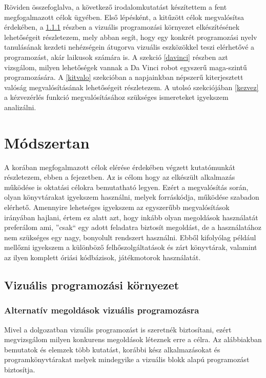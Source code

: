 \documentclass[12pt,a4paper,oneside]{report} %
\begin{document}
\par Röviden összefoglalva, a következő irodalomkutatást készítettem a fent megfogalmazott célok ügyében. Első lépésként,  a kitűzött célok  megvalósítsa érdekében, a \ref{vizuprogkor} részben a vizuális programozási környezet elkészítésének lehetőségeit részletezem, mely abban segít, hogy egy konkrét programozási nyelv tanulásának kezdeti nehézségein átugorva vizuális eszközökkel teszi elérhetővé a programozást, akár laikusok számára is. A  szekció \ref{davinci} részben azt vizsgálom, milyen lehetőségek vannak a Da Vinci robot egyszerű maga-szintű programozására. A \ref{kitvalo} szekcióban a napjainkban népszerű kiterjesztett valóság megvalósításának lehetőségeit részletezem. A  utolsó szekciójában \ref{kezvez} a kézvezérlés funkció megvalósításához szükséges ismereteket igyekszem analizálni.


\chapter{Módszertan}
\label{modtan}
A korában megfogalmazott célok elérése érdekében végzett kutatómunkát részletezem, ebben a fejezetben.
Az is célom hogy az elkészült alkalmazás működése is oktatási célokra bemutatható legyen. Ezért a megvalósítás során, olyan könyvtárakat igyekszem használni,  melyek forráskódja, működése szabadon elérhető. Amennyire lehetséges igyekszem az egyszerűbb megvalósítások irányában hajlani, értem ez alatt azt, hogy inkább olyan megoldások használatát preferálom ami, ''csak`` egy adott feladatra biztosít megoldást, de a használatához nem szükséges egy nagy, bonyolult rendszert használni. Ebből  kifolyólag például mellőzni igyekszem a különböző felhőszolgáltatások és zárt könyvtárak, valamint az ilyen komplett óriási kódbázisok, játékmotorok használatát.
\section{Vizuális programozási környezet}
\subsection{Alternatív megoldások vizuális programozásra}
\label{vizuprogkor}
Mivel a dolgozatban vizuális  programozást  is szeretnék biztosítani, ezért megvizsgálom milyen konkurens megoldások léteznek erre a célra. Az alábbiakban bemutatok és elemzek több kutatást, korábbi kész alkalmazásokat és programkönyvtárakat melyek mindegyike a vizuális blokk alapú programozást biztosítja.
\end{document}
